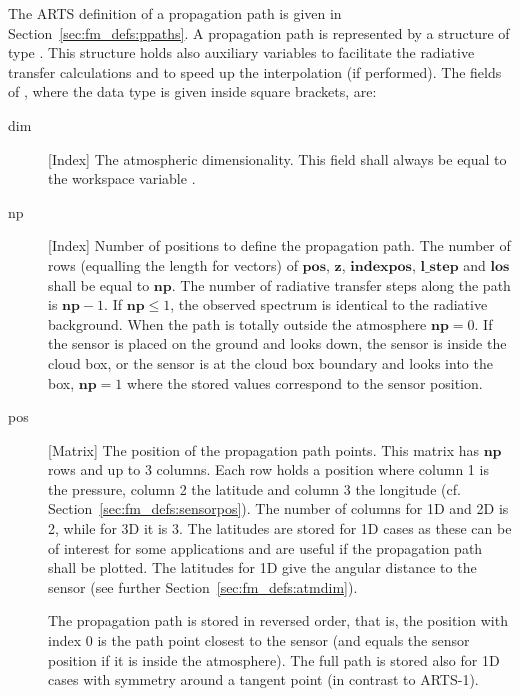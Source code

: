 The ARTS definition of a propagation path is given in
Section~\ref{sec:fm_defs:ppaths}.  A propagation path is represented
by a structure of type . This structure holds also
auxiliary variables to facilitate the radiative transfer calculations
and to speed up the interpolation (if performed). The fields of
, where the data type is given inside square brackets,
are:
\begin{description}

  \item[dim] [Index] The atmospheric dimensionality. This field shall always 
     be equal to the workspace variable .

   \item[np] [Index] Number of positions to define the propagation
     path. The number of rows (equalling the length for vectors) of
     $\mathbf{pos}$, $\mathbf{z}$, $\mathbf{indexpos}$,
     $\mathbf{l\_step}$ and $\mathbf{los}$ shall be equal to
     $\mathbf{np}$. The number of radiative transfer steps along the
     path is $\mathbf{np}-1$. If $\mathbf{np}\leq 1$, the observed
     spectrum is identical to the radiative background. When the path is
     totally outside the atmosphere $\mathbf{np}=0$. If the sensor is
     placed on the ground and looks down, the sensor is inside the
     cloud box, or the sensor is at the cloud box boundary and looks
     into the box, $\mathbf{np}=1$ where the stored values correspond
     to the sensor position.

   \item[pos] [Matrix] The position of the propagation path points.
     This matrix has $\mathbf{np}$ rows and up to 3 columns. Each row
     holds a position where column 1 is the pressure, column 2 the
     latitude and column 3 the longitude (cf.
     Section~\ref{sec:fm_defs:sensorpos}). The number of columns for
     1D and 2D is 2, while for 3D it is 3. The latitudes are stored
     for 1D cases as these can be of interest for some applications
     and are useful if the propagation path shall be plotted. The
     latitudes for 1D give the angular distance to the sensor (see
     further Section~\ref{sec:fm_defs:atmdim}).
     
     The propagation path is stored in reversed order, that is, the
     position with index 0 is the path point closest to the sensor
     (and equals the sensor position if it is inside the atmosphere).
     The full path is stored also for 1D cases with symmetry around a
     tangent point (in contrast to ARTS-1). 
     

\end{description}
